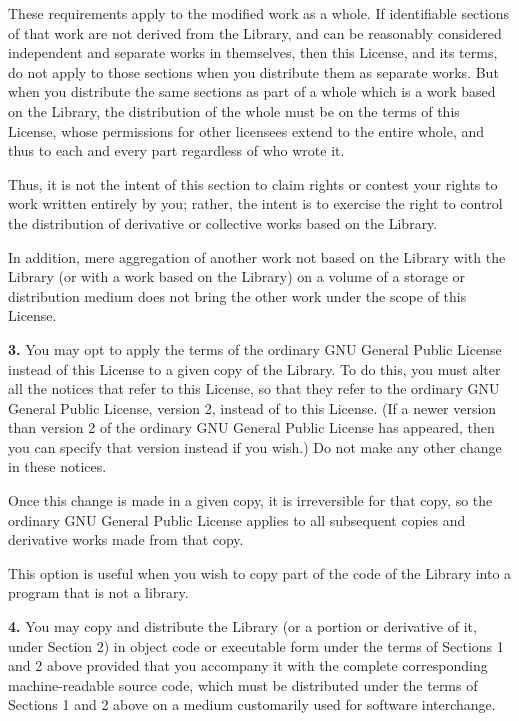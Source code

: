 {{{\begin{itemize}
These requirements apply to the modified work as a whole. If  identifiable
sections of that work are not derived from the Library,  and can be reasonably
considered independent and separate works in  themselves, then this License,
and its terms, do not apply to those  sections when you distribute them as
separate works. But when you  distribute the same sections as part of a whole
which is a work based  on the Library, the distribution of the whole must be
on the terms of  this License, whose permissions for other licensees extend to
the  entire whole, and thus to each and every part regardless of who wrote 
it.  

Thus, it is not the intent of this section to claim rights or contest  your
rights to work written entirely by you; rather, the intent is to  exercise the
right to control the distribution of derivative or  collective works based on
the Library.  

In addition, mere aggregation of another work not based on the Library  with
the Library (or with a work based on the Library) on a volume of  a storage or
distribution medium does not bring the other work under  the scope of this
License. 
\end{itemize}

{\bf 3.} You may opt to apply the terms of the ordinary GNU General Public
License instead of this License to a given copy of the Library. To do this,
you must alter all the notices that refer to this License, so that they refer
to the ordinary GNU General Public License, version 2, instead of to this
License. (If a newer version than version 2 of the ordinary GNU General Public
License has appeared, then you can specify that version instead if you wish.)
Do not make any other change in these notices. 

Once this change is made in a given copy, it is irreversible for that copy, so
the ordinary GNU General Public License applies to all subsequent copies and
derivative works made from that copy. 

This option is useful when you wish to copy part of the code of the Library
into a program that is not a library. 

{\bf 4.} You may copy and distribute the Library (or a portion or derivative
of it, under Section 2) in object code or executable form under the terms of
Sections 1 and 2 above provided that you accompany it with the complete
corresponding machine-readable source code, which must be distributed under
the terms of Sections 1 and 2 above on a medium customarily used for software
interchange. 

}}}
